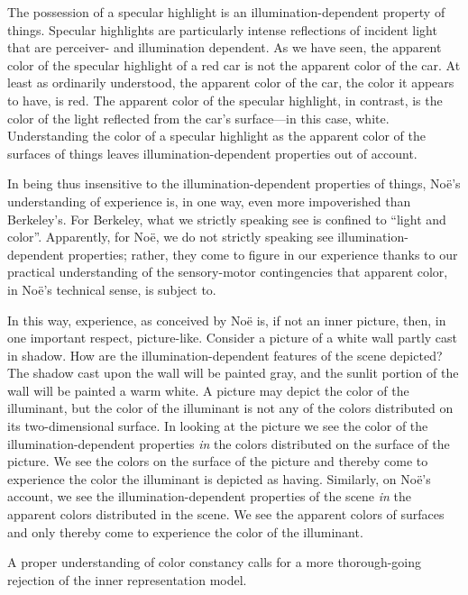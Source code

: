 \documentclass[12pt]{article}
\begin{document}
The possession of a specular highlight is an illumination-dependent property of things. Specular highlights are particularly intense reflections of incident light that are perceiver- and illumination dependent. As we have seen, the apparent color of the specular highlight of a red car is not the apparent color of the car. At least as ordinarily understood, the apparent color of the car, the color it appears to have, is red. The apparent color of the specular highlight, in contrast, is the color of the light reflected from the car's surface---in this case, white. Understanding the color of a specular highlight as the apparent color of the surfaces of things leaves illumination-dependent properties out of account.

In being thus insensitive to the illumination-dependent properties of things, Noë's understanding of experience is, in one way, even more impoverished than Berkeley's. For Berkeley, what we strictly speaking see is confined to ``light and color''. Apparently, for Noë, we do not strictly speaking see illumination-dependent properties; rather, they come to figure in our experience thanks to our practical understanding of the sensory-motor contingencies that apparent color, in Noë's technical sense, is subject to. 

In this way, experience, as conceived by Noë is, if not an inner picture, then, in one important respect, picture-like. Consider a picture of a white wall partly cast in shadow. How are the illumination-dependent features of the scene depicted? The shadow cast upon the wall will be painted gray, and the sunlit portion of the wall will be painted a warm white. A picture may depict the color of the illuminant, but the color of the illuminant is not any of the colors distributed on its two-dimensional surface. In looking at the picture we see the color of the illumination-dependent properties \emph{in} the colors distributed on the surface of the picture. We see the colors on the surface of the picture and thereby come to experience the color the illuminant is depicted as having. Similarly, on Noë's account, we see the illumination-dependent properties of the scene \emph{in} the apparent colors distributed in the scene. We see the apparent colors of surfaces and only thereby come to experience the color of the illuminant. 

A proper understanding of color constancy calls for a more thorough-going rejection of the inner representation model.

\end{document}
